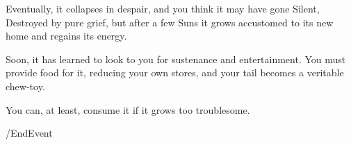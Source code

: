 Eventually, it collapses in despair, and you think it may have gone Silent,
Destroyed by pure grief, but after a few Suns it grows accustomed to its new
home and regains its energy.

Soon, it has learned to look to you for sustenance and entertainment. You must
provide food for it, reducing your own stores, and your tail becomes a veritable
chew-toy.

You can, at least, consume it if it grows too troublesome.

\option /EndEvent
	   
